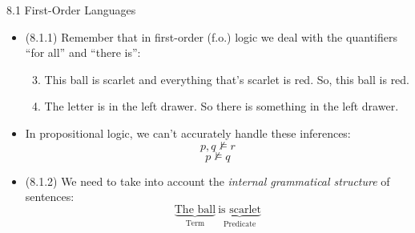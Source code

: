 \begin{frame}{8.1 First-Order Languages}

	\begin{itemize}
		
		\item (8.1.1) Remember that in first-order (f.o.) logic we deal with the quantifiers ``for all'' and ``there is'':
		
		\begin{enumerate}[(1)]
		\setcounter{enumii}{2}
	
		\item This ball is scarlet and everything that's scarlet is red. So, this ball is red.
		
		\item The letter is in the left drawer. So there is something in the left drawer.
	
	\end{enumerate}
	
	\item In propositional logic, we can't accurately handle these inferences:
	\[p,q\nvDash r\]
	\[p\nvDash q\]
		
	\item (8.1.2) We need to take into account the \emph{internal grammatical structure} of sentences:
		\[\underbrace{\text{The ball}}_{\text{Term}}~\underbrace{\text{is scarlet}}_{\text{Predicate}}\]
		
	\end{itemize}

\end{frame}


